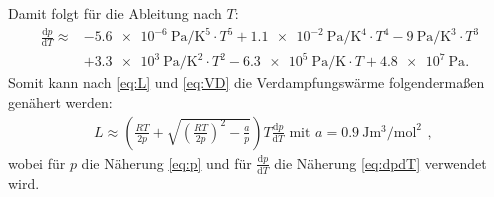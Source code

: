 Damit folgt für die Ableitung nach $T$:
\begin{equation}
\begin{aligned}
\frac{\text{d} p}{\text{d} T} \approx &- \SI{5.6e-6}{\pascal\per\kelvin\tothe{5}} \cdot T^5 + \SI{1.1e-2}{\pascal\per\kelvin\tothe{4}}\cdot T^4 - \SI{9}{\pascal\per\kelvin\tothe{3}} \cdot T^3 \\
&+ \SI{3.3e3}{\pascal\per\kelvin\tothe{2}} \cdot T^2 - \SI{6.3e5}{\pascal\per\kelvin} \cdot T + \SI{4.8e7}{\pascal}\text{.}
\end{aligned}\label{eq:dpdT}
\end{equation}
Somit kann nach \eqref{eq:L} und \eqref{eq:VD} die Verdampfungswärme folgendermaßen genähert werden:
\begin{displaymath}
	\begin{aligned}
		L \approx \left(\frac{R T}{2 p} + \sqrt{\left(\frac{R T}{2p}\right)^2-\frac{a}{p}}\right) T \frac{\text{d} p}{\text{d} T}\text{   mit }a=\SI{0.9}{\joule\meter\tothe{3}\per\mol\squared}
	\end{aligned}\text{,}
\end{displaymath}
wobei für $p$ die Näherung \eqref{eq:p} und für $\frac{\text{d} p}{\text{d} T}$ die Näherung \eqref{eq:dpdT} verwendet wird.



